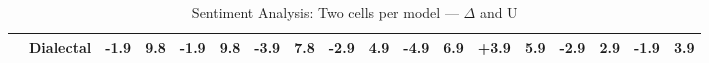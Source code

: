 \begin{table}[h]
{\begin{tabular}{llrrrrrrrrrrrrrrrr}
  & \textbf{Dialectal} & \cellcolor{red!3} -1.9 & \cellcolor{blue!7} 9.8 & \cellcolor{red!3} -1.9 & \cellcolor{blue!7} 9.8 & \cellcolor{red!7} -3.9 & \cellcolor{blue!6} 7.8 & \cellcolor{red!5} -2.9 & \cellcolor{blue!3} 4.9 & \cellcolor{red!9} \textbf{-4.9} & \cellcolor{blue!5} 6.9 & \cellcolor{green!7} +3.9 & \cellcolor{blue!4} 5.9 & \cellcolor{red!5} \textbf{-2.9} & \cellcolor{blue!2} 2.9 & \cellcolor{red!3} -1.9 & \cellcolor{blue!3} 3.9 \\
\bottomrule
\end{tabular}}
\caption{Sentiment Analysis: Two cells per model — $\Delta$ and U}\label{tab:sa_combined_cells}
\end{table}